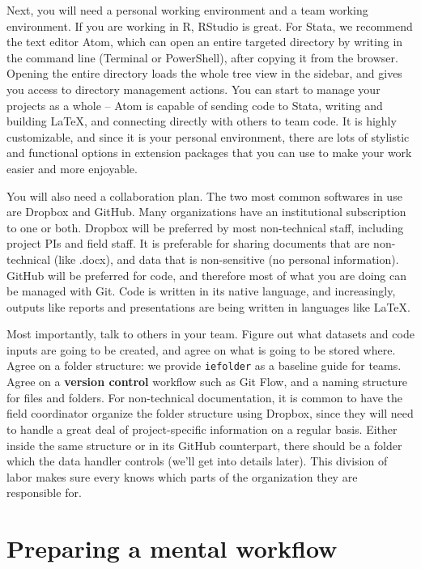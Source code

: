 Next, you will need a personal working environment and a team working environment.
If you are working in R, RStudio is great.
For Stata, we recommend the text editor Atom,
which can open an entire targeted directory by writing 
in the command line (Terminal or PowerShell), after copying it from the browser.
Opening the entire directory loads the whole tree view in the sidebar,
and gives you access to directory management actions.
You can start to manage your projects as a whole --
Atom is capable of sending code to Stata,
writing and building \LaTeX,
and connecting directly with others to team code.
It is highly customizable, and since it is your personal environment,
there are lots of stylistic and functional options in extension packages
that you can use to make your work easier and more enjoyable.

You will also need a collaboration plan.
The two most common softwares in use are Dropbox and GitHub.
Many organizations have an institutional subscription to one or both.
Dropbox will be preferred by most non-technical staff,
including project PIs and field staff.
It is preferable for sharing documents that are non-technical (like .docx),
and data that is non-sensitive (no personal information).
GitHub will be preferred for code,
and therefore most of what you are doing can be managed with Git.
Code is written in its native language,
and increasingly, outputs like reports
and presentations
are being written in languages like \LaTeX.

Most importantly, talk to others in your team.
Figure out what datasets and code inputs are going to be created,
and agree on what is going to be stored where.
Agree on a folder structure: we provide
\texttt{iefolder}
as a baseline guide for teams.
Agree on a \textbf{version control}\cite{blischak2016quick} workflow such as
Git Flow,
and a naming structure for files and folders.
For non-technical documentation,
it is common to have the field coordinator organize
the folder structure using Dropbox,
since they will need to handle a great deal of
project-specific information on a regular basis.
Either inside the same structure or in its GitHub counterpart,
there should be a folder which the data handler controls
(we'll get into details later).
This division of labor makes sure every knows
which parts of the organization they are responsible for.



\section{Preparing a mental workflow}
